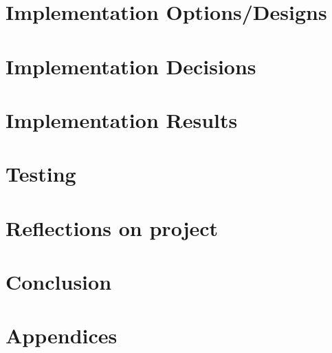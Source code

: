 \documentclass[12pt]{article}
\begin{document}
\section{Implementation Options/Designs}

\newpage

\section{Implementation Decisions}

\newpage


\section{Implementation Results}

\newpage

\section{Testing}

\newpage


\section{Reflections on project}




\section{Conclusion}

\newpage



\section{Appendices}


\newpage
\end{document}
